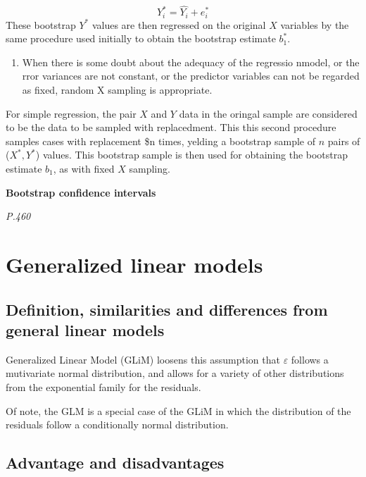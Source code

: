 \documentclass[]{book}
\providecommand{\tightlist}{%
  \setlength{\itemsep}{0pt}\setlength{\parskip}{0pt}}
\begin{document}
\[Y_i^*=\hat{Y_i}+e_i^*\]
These bootstrap \(Y^*\) values are then regressed on the original \(X\) variables by the same procedure used initially to obtain the bootstrap estimate \(b_1^*\).

\begin{enumerate}
\def\labelenumi{(\arabic{enumi})}
\setcounter{enumi}{1}
\tightlist
\item
  When there is some doubt about the adequacy of the regressio nmodel, or the rror variances are not constant, or the predictor variables can not be regarded as fixed, random X sampling is appropriate.
\end{enumerate}

For simple regression, the pair \(X\) and \(Y\) data in the oringal sample are considered to be the data to be sampled with replacedment. This this second procedure samples cases with replacement \$n
times, yelding a bootstrap sample of \(n\) pairs of (\(X^*,Y^*\)) values. This bootstrap sample is then used for obtaining the bootstrap estimate \(b_1\), as with fixed \(X\) sampling.

\textbf{Bootstrap confidence intervals}

\emph{P.460}

\hypertarget{generalized-linear-models}{%
\section{Generalized linear models}\label{generalized-linear-models}}

\hypertarget{definition-similarities-and-differences-from-general-linear-models}{%
\subsection{Definition, similarities and differences from general linear models}\label{definition-similarities-and-differences-from-general-linear-models}}

Generalized Linear Model (GLiM) loosens this assumption that \(\varepsilon\) follows a mutivariate normal distribution, and allows for a variety of other distributions from the exponential family for the residuals.

Of note, the GLM is a special case of the GLiM in which the distribution of the residuals follow a conditionally normal distribution.

\hypertarget{advantage-and-disadvantages}{%
\subsection{Advantage and disadvantages}\label{advantage-and-disadvantages}}
\end{document}
